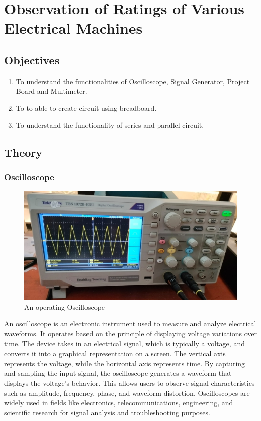 

\chapter{Observation of Ratings of Various Electrical Machines}
\label{exp1}


\section{Objectives}
\begin{enumerate}
  \item To understand the functionalities of Oscilloscope, Signal Generator, Project
        Board and Multimeter.
  \item To to able to create circuit using breadboard.
  \item To understand the functionality of series and parallel circuit.
\end{enumerate}

\section{Theory}
\subsection{Oscilloscope}
\begin{figure}[H]
  \centering
  \includegraphics[scale=0.15]{src/exp01/oscilloscope.jpeg}
  \caption{An operating Oscilloscope}
\end{figure}
An oscilloscope is an electronic instrument used to measure and analyze electrical waveforms. It operates based on the principle of displaying voltage variations over time. The device takes in an electrical signal, which is typically a voltage, and converts it into a graphical representation on a screen. The vertical axis represents the voltage, while the horizontal axis represents time. By capturing and sampling the input signal, the oscilloscope generates a waveform that displays the voltage's behavior. This allows users to observe signal characteristics such as amplitude, frequency, phase, and waveform distortion. Oscilloscopes are widely used in fields like electronics, telecommunications, engineering, and scientific research for signal analysis and troubleshooting purposes.

